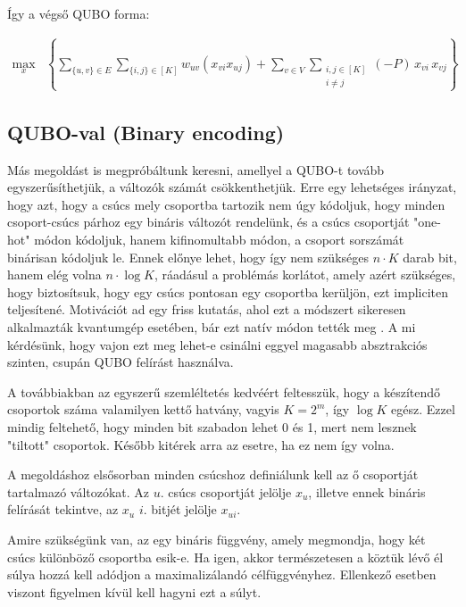 Így a végső QUBO forma:

\begin{align} 
	\max_{x} & \left\{ \sum _{\{{u,v}\} \in E}  \sum _{\{{i,j}\} \in [K]} w_{uv}(x_{vi}  x_{uj}) + \sum _{v \in V } \sum _{\substack{ i,j \in [K] \\  i \neq j}} (-P) \, x_{vi} \, x_{vj}\right\} 
\end{align}



\subsection{QUBO-val (Binary encoding)}\label{sec:QUBObinary}

Más megoldást is megpróbáltunk keresni, amellyel a QUBO-t tovább egyszerűsíthetjük, a változók számát csökkenthetjük. Erre egy lehetséges irányzat, hogy azt, hogy a csúcs mely csoportba tartozik nem úgy kódoljuk, hogy minden csoport-csúcs párhoz egy bináris változót rendelünk, és a csúcs csoportját "one-hot" módon kódoljuk, hanem kifinomultabb módon, a csoport sorszámát binárisan kódoljuk le. Ennek előnye lehet, hogy így nem szükséges $n \cdot K$ darab bit, hanem elég volna $n \cdot \log K$, ráadásul a problémás korlátot, amely azért szükséges, hogy biztosítsuk, hogy egy csúcs pontosan egy csoportba kerüljön, ezt impliciten teljesítené. Motivációt ad egy friss kutatás, ahol ezt a módszert sikeresen alkalmazták kvantumgép esetében, bár ezt natív módon tették meg  \cite{fuchs2020efficient}. A mi kérdésünk, hogy vajon ezt meg lehet-e csinálni eggyel magasabb absztrakciós szinten, csupán QUBO felírást használva.

A továbbiakban az egyszerű szemléltetés kedvéért feltesszük, hogy a készítendő csoportok száma valamilyen kettő hatvány, vagyis $K=2^m$, így $\log K$ egész. Ezzel mindig feltehető, hogy minden bit szabadon lehet 0 és 1, mert nem lesznek "tiltott" csoportok. Később kitérek arra az esetre, ha ez nem így volna.

A megoldáshoz elsősorban minden csúcshoz definiálunk kell az ő csoportját tartalmazó változókat. Az $u.$ csúcs csoportját jelölje $x_u$, illetve ennek bináris felírását tekintve, az $x_u$ $i.$ bitjét jelölje $x_{ui}$.

Amire szükségünk van, az egy bináris függvény, amely megmondja, hogy két csúcs különböző csoportba esik-e. Ha igen, akkor természetesen a köztük lévő él súlya hozzá kell adódjon a maximalizálandó célfüggvényhez. Ellenkező esetben viszont figyelmen kívül kell hagyni ezt a súlyt.

